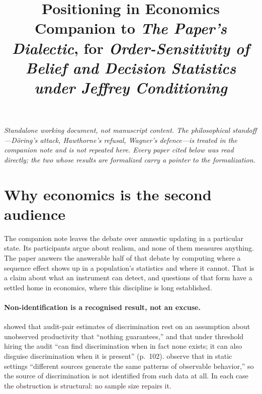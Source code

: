 \documentclass[11pt,a4paper]{article}
\title{Positioning in Economics\\
\large Companion to \emph{The Paper's Dialectic}, for
\emph{Order-Sensitivity of Belief and Decision Statistics under Jeffrey
Conditioning}}
\author{}
\date{}
\begin{document}
\maketitle
\vspace{-2.4em}

\begin{center}\small\itshape
Standalone working document, not manuscript content. The philosophical
standoff---D\"oring's attack, Hawthorne's refusal, Wagner's defence---is treated
in the companion note and is not repeated here. Every paper cited below was read
directly; the two whose results are formalized carry a pointer to the
formalization.
\end{center}

\section*{Why economics is the second audience}

The companion note leaves the debate over amnestic updating in a particular
state. Its participants argue about realism, and none of them measures anything.
The paper answers the answerable half of that debate by computing where a
sequence effect shows up in a population's statistics and where it cannot. That
is a claim about what an instrument can detect, and questions of that form have
a settled home in economics, where this discipline is long established.

\paragraph{Non-identification is a recognised result, not an excuse.}
\citet{Heckman1998} showed that audit-pair estimates of discrimination rest on an
assumption about unobserved productivity that ``nothing guarantees,'' and that
under threshold hiring the audit ``can find discrimination when in fact none
exists; it can also disguise discrimination when it is present'' (p.~102).
\citet{Bohren2019} observe that in static settings ``different sources generate
the same patterns of observable behavior,'' so the source of discrimination is
not identified from such data at all. In each case the obstruction is structural:
no sample size repairs it.
\end{document}
